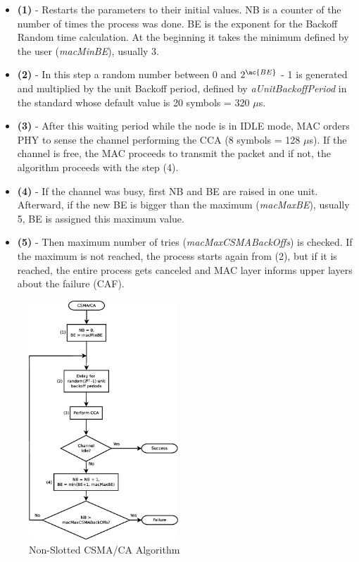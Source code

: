 \begin{itemize}
 \item \textbf{(1)} - Restarts the parameters to their initial values. \ac{NB} is a counter of the number of times the process was done. \ac{BE}
is the exponent for the Backoff Random time calculation. At the beginning it takes the minimum defined by the user (\textit{macMinBE}), usually 3.
 \item \textbf{(2)} - In this step a random number between 0 and $2^{\ac{BE}}$ - 1 is generated and multiplied by the unit Backoff period, defined
by \textit{aUnitBackoffPeriod} in the standard whose default value is 20 symbols = 320 $\mu$s.
 \item \textbf{(3)} - After this waiting period while the node is in IDLE mode, \ac{MAC} orders \ac{PHY} to sense the channel performing the \ac{CCA} 
(8 symbols = 128 $\mu$s). If the channel is free, the \ac{MAC} proceeds to transmit the packet and if not, the algorithm proceeds with the 
step (4).
 \item \textbf{(4)} - If the channel was busy, first \ac{NB} and \ac{BE} are raised in one unit. Afterward, if the new \ac{BE} is bigger than the maximum
(\textit{macMaxBE}), usually 5, \ac{BE} is assigned this maximum value.
 \item \textbf{(5)} - Then maximum number of tries (\textit{macMaxCSMABackOffs}) is checked. If the maximum is not reached, the process starts again from (2),
but if it is reached, the entire process gets canceled and \ac{MAC} layer informs upper layers about the failure (\ac{CAF}).
\end{itemize}

\begin{figure}[!ht]
 \begin{center}
  \includegraphics[width=0.5\textwidth]{CSMACA.eps}
 \end{center}
 \caption{Non-Slotted \ac{CSMA/CA} Algorithm \cite{IEEE802.15.4-2006}}
 \label{fig:CSMACA}
\end{figure}


